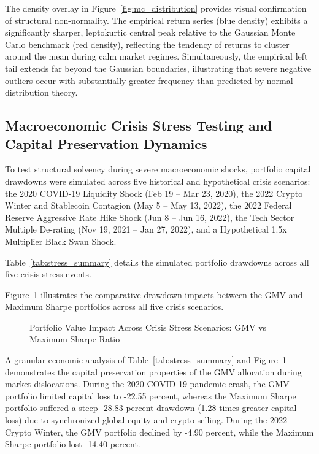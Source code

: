 The density overlay in Figure~\ref{fig:mc_distribution} provides visual confirmation of structural non-normality. The empirical return series (blue density) exhibits a significantly sharper, leptokurtic central peak relative to the Gaussian Monte Carlo benchmark (red density), reflecting the tendency of returns to cluster around the mean during calm market regimes. Simultaneously, the empirical left tail extends far beyond the Gaussian boundaries, illustrating that severe negative outliers occur with substantially greater frequency than predicted by normal distribution theory.

\subsection{Macroeconomic Crisis Stress Testing and Capital Preservation Dynamics}

To test structural solvency during severe macroeconomic shocks, portfolio capital drawdowns were simulated across five historical and hypothetical crisis scenarios: the 2020 COVID-19 Liquidity Shock (Feb 19 -- Mar 23, 2020), the 2022 Crypto Winter and Stablecoin Contagion (May 5 -- May 13, 2022), the 2022 Federal Reserve Aggressive Rate Hike Shock (Jun 8 -- Jun 16, 2022), the Tech Sector Multiple De-rating (Nov 19, 2021 -- Jan 27, 2022), and a Hypothetical 1.5x Multiplier Black Swan Shock.

Table~\ref{tab:stress_summary} details the simulated portfolio drawdowns across all five crisis stress events.



Figure~\ref{fig:stress_test} illustrates the comparative drawdown impacts between the GMV and Maximum Sharpe portfolios across all five crisis scenarios.

\begin{figure}[H]
  \centering
  \caption{Portfolio Value Impact Across Crisis Stress Scenarios: GMV vs Maximum Sharpe Ratio}
  \label{fig:stress_test}
\end{figure}

A granular economic analysis of Table~\ref{tab:stress_summary} and Figure~\ref{fig:stress_test} demonstrates the capital preservation properties of the GMV allocation during market dislocations. During the 2020 COVID-19 pandemic crash, the GMV portfolio limited capital loss to -22.55 percent, whereas the Maximum Sharpe portfolio suffered a steep -28.83 percent drawdown (1.28 times greater capital loss) due to synchronized global equity and crypto selling. During the 2022 Crypto Winter, the GMV portfolio declined by -4.90 percent, while the Maximum Sharpe portfolio lost -14.40 percent.

